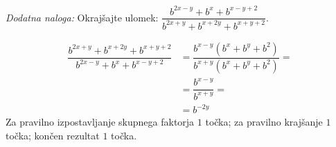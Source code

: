 \documentclass[addpoints]{exam}
\begin{document}
\begin{questions}
        

    \bonusquestion[3]
    \textit{Dodatna naloga:} Okrajšajte ulomek: $\dfrac{b^{2x-y}+b^x+b^{x-y+2}}{b^{2x+y}+b^{x+2y}+b^{x+y+2}}$.

    \begin{solution}[7cm]
        \begin{align*}
            \dfrac{b^{2x+y}+b^{x+2y}+b^{x+y+2}}{b^{2x-y}+b^x+b^{x-y+2}} &= \dfrac{b^{x-y}(b^x+b^y+b^2)}{b^{x+y}(b^x+b^y+b^2)}= \\
                                                                        &= \dfrac{b^{x-y}}{b^{x+y}}= \\
                                                                        &= b^{-2y}
        \end{align*}
        Za pravilno izpostavljanje skupnega faktorja $1$ točka; za pravilno krajšanje $1$ točka; končen rezultat $1$ točka.
    \end{solution}




\end{questions}
\end{document}

